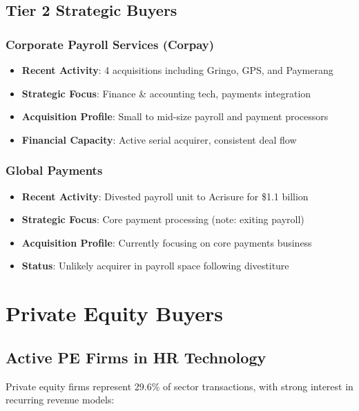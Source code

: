 \documentclass[12pt,a4paper]{article}
\begin{document}
\subsection{Tier 2 Strategic Buyers}

\subsubsection{Corporate Payroll Services (Corpay)}
\begin{itemize}[leftmargin=0.5cm]
    \item \textbf{Recent Activity}: 4 acquisitions including Gringo, GPS, and Paymerang
    \item \textbf{Strategic Focus}: Finance \& accounting tech, payments integration
    \item \textbf{Acquisition Profile}: Small to mid-size payroll and payment processors
    \item \textbf{Financial Capacity}: Active serial acquirer, consistent deal flow
\end{itemize}

\subsubsection{Global Payments}
\begin{itemize}[leftmargin=0.5cm]
    \item \textbf{Recent Activity}: Divested payroll unit to Acrisure for \$1.1 billion
    \item \textbf{Strategic Focus}: Core payment processing (note: exiting payroll)
    \item \textbf{Acquisition Profile}: Currently focusing on core payments business
    \item \textbf{Status}: Unlikely acquirer in payroll space following divestiture
\end{itemize}

\section{Private Equity Buyers}

\subsection{Active PE Firms in HR Technology}

Private equity firms represent 29.6\% of sector transactions, with strong interest in recurring revenue models:
\end{document}
